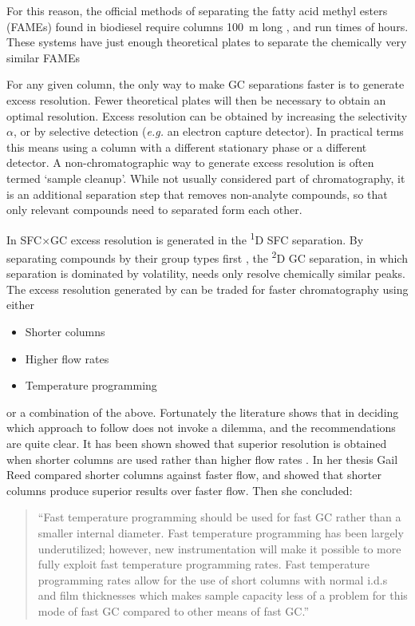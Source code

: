 For this reason, the official methods of separating the fatty acid methyl esters
(FAMEs) found in biodiesel require columns \SI{100}{\metre} long
\autocite{AOCS2017}, and run times of hours. These systems have just enough
theoretical plates to separate the chemically very similar FAMEs

For any given column, the only way to make GC separations faster is to generate
excess resolution. Fewer theoretical plates will then be necessary to obtain an
optimal resolution. Excess resolution can be obtained by increasing the
selectivity $\alpha$, or by selective detection (\textit{e.g.} an electron capture
detector). In practical terms this means using a column with a different
stationary phase or a different detector. A non-chromatographic way to generate
excess resolution is often termed `sample cleanup'. While not usually considered
part of chromatography, it is an additional separation step that removes
non-analyte compounds, so that only relevant compounds need to
separated form each other. 



In SFC×GC excess resolution is generated in the \textsuperscript{1}D SFC
separation. By separating compounds by their group types first
\autocite{Venter2006}, the \textsuperscript{2}D GC separation, in which
separation is dominated by volatility, needs only resolve chemically similar
peaks. The excess resolution generated by can be traded for faster
chromatography using either

\begin{itemize}
  \item Shorter columns
  \item Higher flow rates
  \item Temperature programming
  
\end{itemize}

or a combination of the above. Fortunately the literature shows that in deciding
which approach to follow does not invoke a dilemma, and the recommendations are
quite clear. It has been shown showed that superior resolution is obtained when
shorter columns are used rather than higher flow rates \autocite{Klee2002}. In
her thesis Gail Reed \autocite{Reed1999} compared shorter columns against faster
flow, and showed that shorter columns produce superior results over faster flow.
Then she concluded:
\begin{quotation}
``Fast temperature programming should be used for fast
GC rather than a smaller internal diameter. Fast temperature programming has been
largely underutilized; however, new instrumentation will make it possible to more fully
exploit fast temperature programming rates. Fast temperature programming rates allow
for the use of short columns with normal i.d.s and film thicknesses which makes sample
capacity less of a problem for this mode of fast GC compared to other means of fast GC.''
\end{quotation}

